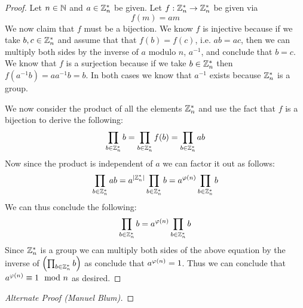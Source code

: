         \begin{proof}
            Let $n \in \mathbb{N}$ and $a \in \mathbb{Z}_{n}^{*}$ be given. Let $f: \mathbb{Z}_{n}^{*} \rightarrow \mathbb{Z}_{n}^{*}$
            be given via 
            \[
                f(m) = am
            \]
            We now claim that $f$ must be a bijection. We know $f$ is injective because if we take
            $b, c \in \mathbb{Z}_{n}^{*}$ and assume that that $f(b) = f(c)$, i.e. $ab = ac$, then we can
            multiply both sides by the inverse of $a$ modulo $n$, $a^{-1}$, and conclude that $b = c$. We know
            that $f$ is a surjection because if we take $b \in \mathbb{Z}_{n}^{*}$ then 
            $f(a^{-1}b) = aa^{-1}b = b$. In both cases we know that $a^{-1}$ exists because $\mathbb{Z}_{n}^{*}$
            is a group.

            We now consider the product of all the elements $\mathbb{Z}_{n}^{*}$ and use the fact that $f$
            is a bijection to derive the following:
            \[
                \prod_{b \in \mathbb{Z}_{n}^{*}} b = \prod_{b \in \mathbb{Z}_{n}^{*}} f(b) = \prod_{b \in \mathbb{Z}_{n}^{*}} ab
            \]
            Now since the product is independent of $a$ we can factor it out as follows:
            \[
                \prod_{b \in \mathbb{Z}_{n}^{*}} ab = a^{|\mathbb{Z}_{n}^{*}|} \prod_{b \in \mathbb{Z}_{n}^{*}} b
                                           = a^{\varphi\left(n\right)} \prod_{b \in \mathbb{Z}_{n}^{*}} b
            \]
            We can thus conclude the following:
            \[
                \prod_{b \in \mathbb{Z}_{n}^{*}} b = a^{\varphi\left(n\right)} \prod_{b \in \mathbb{Z}_{n}^{*}} b
            \]
            Since $\mathbb{Z}_{n}^{*}$ is a group we can multiply both sides of the above equation
            by the inverse of $\left(\prod_{b \in \mathbb{Z}_{n}^{*}} b\right)$ as conclude that $a^{\varphi\left(n\right)} = 1$.
            Thus we can conclude that $a^{\varphi\left(n\right)} \equiv 1 \mod n$ as desired. \QED
        \end{proof}
        \begin{proof}[Alternate Proof (Manuel Blum)]
        \end{proof}

